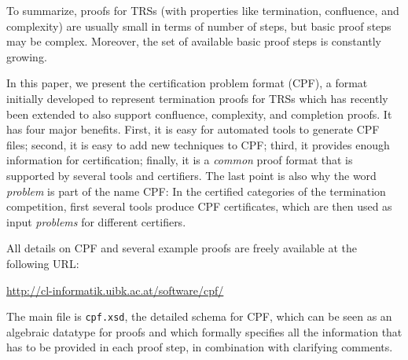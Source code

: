 \documentclass[USenglish]{eptcs}
\begin{document}
To summarize, proofs for TRSs (with properties like termination, confluence, and
complexity) are usually small in terms of number of steps, but basic proof steps
may be complex. Moreover, the set of available basic proof steps is constantly
growing. 

In this paper, we present the certification problem
format (CPF), a format initially developed to represent termination proofs for TRSs which
has recently been extended to also support confluence, complexity, and completion proofs.
It has four major benefits.
First, it is easy for automated tools to generate CPF files; second,
it is easy to add new techniques to CPF; third, it provides enough
information for certification; finally, it is 
a \emph{common} proof format that is supported by several tools and 
certifiers.
The last point is also why the word \emph{problem} is part of the name CPF: In
the certified categories of the termination competition, first several tools
produce CPF certificates, which are then used as input \emph{problems} for
different certifiers.

All details on CPF and several example proofs are freely available at the following URL:
\begin{center}
\url{http://cl-informatik.uibk.ac.at/software/cpf/}
\end{center}
The main file is \texttt{cpf.xsd}, the detailed schema for CPF,
which can be seen as an algebraic
datatype for proofs and which formally specifies all the information that has to be provided
in each proof step, in combination with clarifying comments. 
\end{document}
